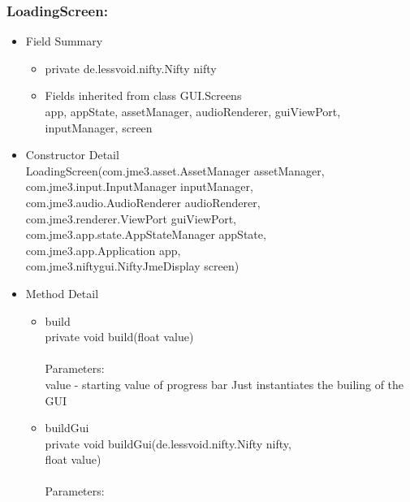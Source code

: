 \documentclass[letterpaper]{article}
\begin{document}
						\subsubsection*{LoadingScreen:}
						\vspace{0.1in}	
							\begin{itemize}
								\item	Field Summary
										\begin{itemize}
											\item	private de.lessvoid.nifty.Nifty	nifty 
											\item	Fields inherited from class GUI.Screens \\
													app, appState, assetManager, audioRenderer, guiViewPort, inputManager, screen
										\end{itemize}
								\item	Constructor Detail \\
										LoadingScreen(com.jme3.asset.AssetManager assetManager, \\
		            com.jme3.input.InputManager inputManager, \\
		            com.jme3.audio.AudioRenderer audioRenderer, \\
		            com.jme3.renderer.ViewPort guiViewPort, \\
		            com.jme3.app.state.AppStateManager appState, \\
		            com.jme3.app.Application app, \\
		            com.jme3.niftygui.NiftyJmeDisplay screen)
								\item	Method Detail
										\begin{itemize}
											\item	build \\
													private void build(float value) \\ \\
													Parameters: \\
													value - starting value of progress bar Just instantiates the builing of the GUI
											\item	buildGui \\
													private void buildGui(de.lessvoid.nifty.Nifty nifty, \\
				            float value) \\ \\
													Parameters: \\

\end{itemize}
\end{itemize}
\end{document}
